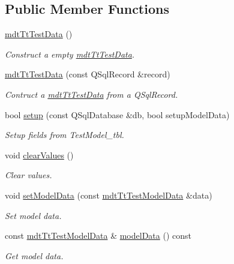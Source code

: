 \subsection*{Public Member Functions}
\begin{DoxyCompactItemize}
\item 
\hyperlink{classmdt_tt_test_data_a851842f98eda70ef3e13162c390619a2}{mdt\-Tt\-Test\-Data} ()
\begin{DoxyCompactList}\small\item\em Construct a empty \hyperlink{classmdt_tt_test_data}{mdt\-Tt\-Test\-Data}. \end{DoxyCompactList}\item 
\hyperlink{classmdt_tt_test_data_a31ee8551d06359bfae3f84d7f9d77b05}{mdt\-Tt\-Test\-Data} (const Q\-Sql\-Record \&record)
\begin{DoxyCompactList}\small\item\em Contruct a \hyperlink{classmdt_tt_test_data}{mdt\-Tt\-Test\-Data} from a Q\-Sql\-Record. \end{DoxyCompactList}\item 
bool \hyperlink{classmdt_tt_test_data_aa702caa1a409448535f4288c19bb53be}{setup} (const Q\-Sql\-Database \&db, bool setup\-Model\-Data)
\begin{DoxyCompactList}\small\item\em Setup fields from Test\-Model\-\_\-tbl. \end{DoxyCompactList}\item 
void \hyperlink{classmdt_tt_test_data_a5e7d9bc9880747e881f0b1f807542481}{clear\-Values} ()
\begin{DoxyCompactList}\small\item\em Clear values. \end{DoxyCompactList}\item 
void \hyperlink{classmdt_tt_test_data_ad0ea2d854bd9fe944daab89926708380}{set\-Model\-Data} (const \hyperlink{classmdt_tt_test_model_data}{mdt\-Tt\-Test\-Model\-Data} \&data)
\begin{DoxyCompactList}\small\item\em Set model data. \end{DoxyCompactList}\item 
const \hyperlink{classmdt_tt_test_model_data}{mdt\-Tt\-Test\-Model\-Data} \& \hyperlink{classmdt_tt_test_data_a071f9f0bf646b44c83c3c9b6d3cc126d}{model\-Data} () const 
\begin{DoxyCompactList}\small\item\em Get model data. \end{DoxyCompactList}\end{DoxyCompactItemize}
